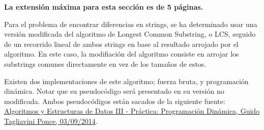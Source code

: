 \begin{mdframed}
    \textbf{La extensión máxima para esta sección es de 5 páginas.}
\end{mdframed}

Para el problema de encontrar diferencias en strings, se ha determinado usar una versión modificada del algoritmo de Longest Common Substring, o LCS, seguido de un recorrido lineal de ambos strings en base al resultado arrojado por el algoritmo. En este caso, la modifiación del algoritmo consiste en arrojar los substrings comunes directamente en vez de los tamaños de estos.

Existen dos implementaciones de este algoritmo; fuerza bruta, y programación dinámica. Notar que su pseudocódigo será presentado en su versión no modificada. Ambos pseudocódigos están sacados de la siguiente fuente: \href{https://www.cubawiki.com.ar/images/1/1a/Lcs_tagliavini.pdf}{Algoritmos y Estructuras de Datos III - Práctica: Programación Dinámica, Guido Tagliavini Ponce, 03/09/2014}.